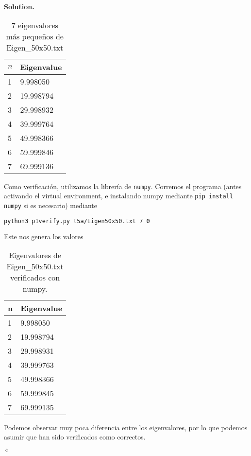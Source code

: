 \documentclass{article}
\theoremstyle{problemstyle}
\newenvironment{solution}{%
  \begin{mdframed}[linewidth=0.8pt,linecolor=Gray,backgroundcolor=Gray!5,roundcorner=5pt]%
  \noindent\textbf{Solution.}%
}{%
\hfill $ \diamond $ 
  \end{mdframed}%
}
\begin{document}
\begin{solution}
\begin{enumerate}
\begin{table}[H]
			      \begin{center}
				      \begin{tabular}{|l|l|}
					      \hline
					      $ n $ & Eigenvalue \\
					      \hline
					      1     & 9.998050\\
					      \hline
					      2     & 19.998794\\
					      \hline
					      3     & 29.998932\\
					      \hline
					      4     & 39.999764\\
					      \hline
					      5     & 49.998366\\
					      \hline
					      6     & 59.999846\\
					      \hline
					      7     & 69.999136\\
					      \hline
				      \end{tabular}
			      \end{center}
			      \caption{7 eigenvalores m\'as peque\~nos de Eigen\_50x50.txt}\label{tab:inv50x50}
		      \end{table}
		      Como verificaci\'on, utilizamos la librer\'ia de \texttt{numpy}. Corremos el programa (antes activando el virtual environment, e instalando numpy mediante \texttt{pip install numpy} si es necesario) mediante
		      \begin{center}
			      \texttt{python3 p1\textunderscore verify.py t5a/Eigen\textunderscore50x50.txt 7 0}
		      \end{center}
		      Este nos genera los valores
		      \begin{table}[H]
			      \begin{center}
				      \begin{tabular}{|l|l|}
					      \hline
					      n & Eigenvalue \\
					      \hline
					      1 & 9.998050\\
					      \hline
					      2 & 19.998794\\
					      \hline
					      3 & 29.998931\\
					      \hline
					      4 & 39.999763\\
					      \hline
					      5 & 49.998366\\
					      \hline
					      6 & 59.999845\\
					      \hline
					      7 & 69.999135\\
					      \hline
				      \end{tabular}
			      \end{center}
			      \caption{Eigenvalores de Eigen\_50x50.txt verificados con numpy.}\label{tab:invpy50x50}
		      \end{table}
		      Podemos observar muy poca diferencia entre los eigenvalores, por lo
		      que podemos asumir que han sido verificados como correctos.


\end{enumerate}
\end{solution}
\end{document}
